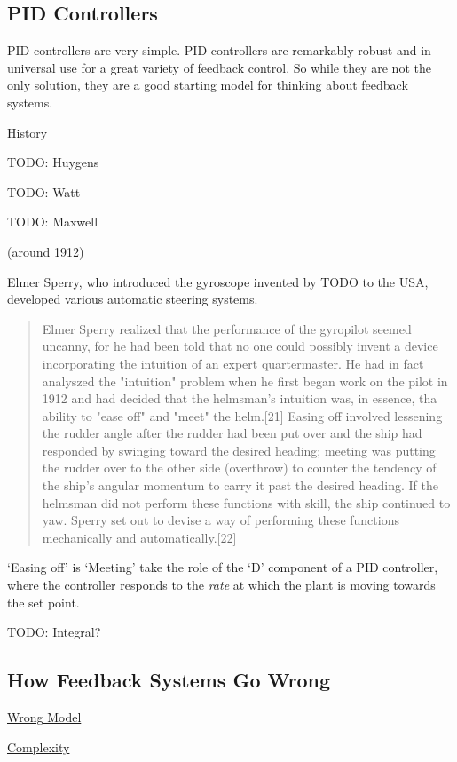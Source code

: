 \subsection{PID Controllers}

PID controllers are very simple. PID controllers are remarkably robust and in universal use for a
great variety of feedback control. So while they are not the only solution, they are a good starting
model for thinking about feedback systems.

\underline{History}

TODO: Huygens

TODO: Watt

TODO: Maxwell

(around 1912)

Elmer Sperry, who introduced the gyroscope invented by TODO to the USA, developed various automatic
steering systems.

\begin{quote}
Elmer Sperry realized that the performance of the gyropilot seemed uncanny, for he had been told
that no one could possibly invent a device incorporating the intuition of an expert quartermaster.
He had in fact analyszed the "intuition" problem when he first began work on the pilot in 1912 and
had decided that the helmsman's intuition was, in essence, tha ability to "ease off" and "meet" the
helm.[21] Easing off involved lessening the rudder angle after the rudder had been put over and the
ship had responded by swinging toward the desired heading; meeting was putting the rudder over to
the other side (overthrow) to counter the tendency of the ship's angular momentum to carry it past
the desired heading. If the helmsman did not perform these functions with skill, the ship continued
to yaw. Sperry set out to devise a way of performing these functions mechanically and automatically.[22]
\end{quote}

`Easing off' is `Meeting' take the role of the `D' component of a PID controller, where the
controller responds to the \textit{rate} at which the plant is moving towards the set point.

TODO: Integral?


\subsection{How Feedback Systems Go Wrong}

\underline{Wrong Model}

\underline{Complexity}

